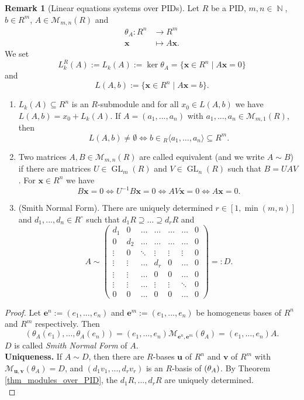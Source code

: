\documentclass[12pt,a4paper]{report}
\theoremstyle{definition}
\newtheorem{Remark}[theorem]{Remark}
\theoremstyle{num.custom-title}
\let\o\relax %
\DeclareMathOperator{\o}{\mathsf{o}}
\let\Im\relax %
\DeclareMathOperator{\Im}{Im}
\DeclareMathOperator{\N}{\mathbb{N}}
\DeclareMathOperator{\sse}{\subseteq}
\DeclareMathOperator{\GL}{GL}
\newcommand{\M}{\mathcal{M}}
\newcommand{\x}{\mathbf{x}}
\renewcommand{\iff}{\Leftrightarrow}
\begin{document}
\begin{Remark}[Linear equations systems over PIDs]
Let $R$ be a PID, $m,n \in \N$, $b \in R^m$, $A \in \M_{m,n}(R)$ and
\begin{align*}
\theta_A \colon R^n & \to R^m \\
\x &\mapsto A \x.
\end{align*}
We set
\[
L_k^R(A) := L_k(A) := \ker \theta_A = \{\x \in R^n \mid A\x = 0\}
\]
and
\[
L(A,b) := \{\x \in R^n \mid A\x = b\}.
\]
\begin{enumerate}
\item $L_k(A) \sse R^n$ is an $R$-submodule and for all $x_0 \in L(A,b)$ we have $L(A,b) = x_0 + L_k(A)$. If $A=(a_1,...,a_n)$ with $a_1,...,a_n \in \M_{m,1}(R)$, then
\[
L(A,b) \neq \emptyset \iff b \in {}_R \langle a_1, \ldots, a_n \rangle \sse R^m.
\]
\item Two matrices $A,B \in \M_{m,n}(R)$ are called equivalent (and we write $A \sim B$) if there are matrices $U \in \GL_m(R)$ and $V \in \GL_n(R)$ such that $B=UAV$. For $\x \in R^n$ we have
\[
B\x = 0 \iff U^{-1} B \x = 0 \iff A V \x = 0 \iff A \x = 0.
\]
\item (Smith Normal Form). There are uniquely determined $r \in [1,\min(m,n)]$ and $d_1,...,d_n \in R^\circ$ such that $d_1 R \supseteq \ldots \supseteq d_r R$ and
\[
A \sim
\begin{pmatrix}
d_1 & 0 & \ldots & \ldots & \ldots & \ldots & 0 \\
0 & d_2 & \ldots & \ldots & \ldots & \ldots & 0 \\
\vdots & 0 & \ddots & \vdots & \vdots & \vdots & 0 \\
\vdots & \vdots & \ldots & d_r & 0 & \ldots & 0 \\
\vdots & \vdots & \ldots & 0 & 0 & \ldots & 0 \\
\vdots & \vdots & \ldots & \vdots & \vdots & \ddots & 0 \\
0 & 0 & \ldots & 0 & 0 & \ldots & 0
\end{pmatrix}
=: D.
\]
\end{enumerate}
\begin{proof}
Let $\mathbf{e}^n := (e_1,...,e_n)$ and $\mathbf{e}^m := (e_1,...,e_n)$ be homogeneus bases of $R^n$ and $R^m$ respectively. Then
\[
(\theta_A(e_1),\ldots,\theta_A(e_n)) = (e_1,\ldots,e_n) \M_{\mathbf{e}^n,\mathbf{e}^m}(\theta_A) = (e_1,\ldots,e_n)A.
\]
$D$ is called \emph{Smith Normal Form} of $A$.\\
\textbf{Uniqueness.} If $A \sim D$, then there are $R$-bases $\mathbf{u}$ of $R^n$ and $\mathbf{v}$ of $R^m$ with $\M_{\mathbf{u},\mathbf{v}}(\theta_A) = D$, and $(d_1 v_1,...,d_r v_r)$ is an $R$-basis of $\Im(\theta_A)$. By Theorem \ref{thm_modules_over_PID}, the $d_1 R,...,d_r R$ are uniquely determined.\\

\end{proof}
\end{Remark}
\end{document}
